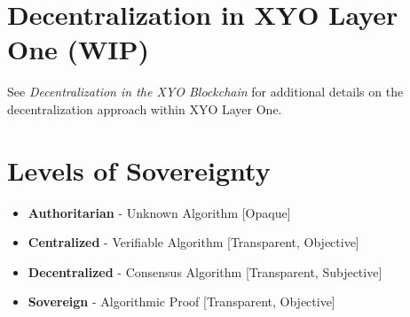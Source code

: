 \documentclass{article}
\begin{document}
\section{Decentralization in XYO Layer One (WIP)}
See \textit{Decentralization in the XYO Blockchain} for additional details on
the decentralization approach within XYO Layer One.

\section{Levels of Sovereignty}
\begin{itemize}
    \item \textbf{Authoritarian} - Unknown Algorithm [Opaque]
    \item \textbf{Centralized} - Verifiable Algorithm [Transparent, Objective]
    \item \textbf{Decentralized} - Consensus Algorithm [Transparent, Subjective]
    \item \textbf{Sovereign} - Algorithmic Proof [Transparent, Objective]
\end{itemize}
\end{document}
